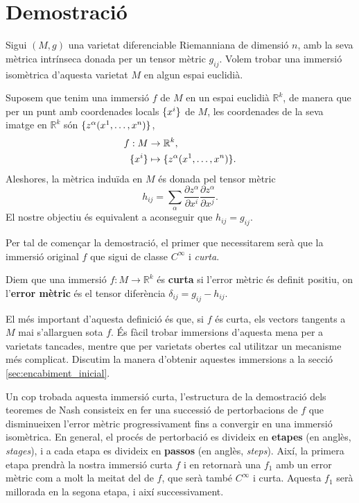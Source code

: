 \section{Demostració}
Sigui $(M,g)$ una varietat diferenciable Riemanniana de dimensió $n$, amb la seva mètrica intrínseca donada per un tensor mètric $g_{ij}$. Volem trobar una immersió isomètrica d'aquesta varietat $M$ en algun espai euclidià.

Suposem que tenim una immersió $f$ de $M$ en un espai euclidià $\mathbb R^k$, de manera que per un punt amb coordenades locals $\{x^i\}$ de $M$, les coordenades de la seva imatge en $\mathbb R^k$ són $\{z^\alpha(x^1, \dots, x^n)\}$,
\begin{align*}
    f:M&\to \mathbb R^k, \\
    \{x^i\} &\mapsto \{z^\alpha(x^1, \dots, x^n)\}. 
\end{align*}
Aleshores, la mètrica induïda en $M$ és donada pel tensor mètric
\begin{equation*}
    h_{ij} = \sum_\alpha \frac{\partial z^\alpha}{\partial x^i}\frac{\partial z^\alpha}{\partial x^j}.
\end{equation*}
El nostre objectiu és equivalent a aconseguir que $h_{ij}=g_{ij}.$

Per tal de començar la demostració, el primer que necessitarem serà que la immersió original $f$ que sigui de classe $C^\infty$ i \textit{curta}.
\begin{defi}
    Diem que una immersió $f:M\to \mathbb R^k$ és \textbf{curta} si l'error mètric és definit positiu, on l'\textbf{error mètric} és el tensor diferència $\delta_{ij} = g_{ij} - h_{ij}$.
\end{defi}
El més important d'aquesta definició és que, si $f$ és curta, els vectors tangents a $M$ mai s'allarguen sota $f$. És fàcil trobar immersions d'aquesta mena per a varietats tancades, mentre que per varietats obertes cal utilitzar un mecanisme més complicat. Discutim la manera d'obtenir aquestes immersions a la secció \ref{sec:encabiment_inicial}.

Un cop trobada aquesta immersió curta, l'estructura de la demostració dels teoremes de Nash consisteix en fer una successió de pertorbacions de $f$ que disminueixen l'error mètric progressivament fins a convergir en una immersió isomètrica. En general, el procés de pertorbació es divideix en \textbf{etapes} (en anglès, \textit{stages}), i a cada etapa es divideix en \textbf{passos} (en anglès, \textit{steps}). Així, la primera etapa prendrà la nostra immersió curta $f$ i en retornarà una $f_1$ amb un error mètric com a molt la meitat del de $f$, que serà també $C^\infty$ i curta. Aquesta $f_1$ serà millorada en la segona etapa, i així successivament.

